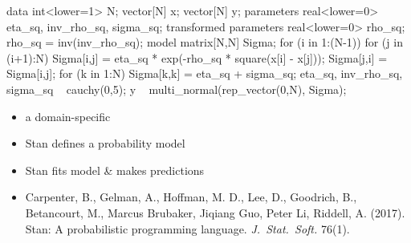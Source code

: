 \documentclass[9pt]{report}
\begin{document}
%
\vspace*{-5pt}
\begin{stancode}
data {
  int<lower=1> N;  vector[N] x; vector[N] y;
} parameters {
  real<lower=0> eta_sq, inv_rho_sq, sigma_sq;
} transformed parameters {
  real<lower=0> rho_sq; rho_sq = inv(inv_rho_sq);
} model {
  matrix[N,N] Sigma;
  for (i in 1:(N-1)) {
    for (j in (i+1):N) {
      Sigma[i,j] = eta_sq * exp(-rho_sq * square(x[i] - x[j]));
      Sigma[j,i] = Sigma[i,j];
  }}
  for (k in 1:N) Sigma[k,k] = eta_sq + sigma_sq;
  eta_sq, inv_rho_sq, sigma_sq ~ cauchy(0,5);
  y ~ multi_normal(rep_vector(0,N), Sigma);
}
\end{stancode}


%
\begin{itemize}
\item a domain-specific 
\item Stan  defines a  probability model
\item Stan  fits model \& makes predictions
\item \footnotesize Carpenter, B., Gelman, A., Hoffman, M. D., Lee, D., Goodrich, B., Betancourt, M., Marcus Brubaker, Jiqiang Guo, Peter Li, Riddell, A. (2017). Stan: A probabilistic programming language. {\slshape J.\ Stat.\ Soft.} 76(1).
\end{itemize}
\end{document}
